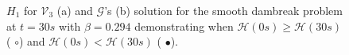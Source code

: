 \documentclass[SingleSpace,12pt,Journal]{Serre_ASCE}
\begin{document}
\begin{figure}
\centering
{}
\caption{$H_1$ for $\mathcal{V}_3$ (a) and $\mathcal{G}$'s (b) solution for the smooth dambreak problem at $t = 30s$ with $\beta = 0.294$ demonstrating when $\mathcal{H}(0s) \ge \mathcal{H}(30s)$ ({\color{red} $\circ$}) and $\mathcal{H}(0s) < \mathcal{H}(30s)$ ({\color{blue} $\bullet$}).}
\label{fig:o3a4dxHallsign}
\end{figure}
\end{document}
